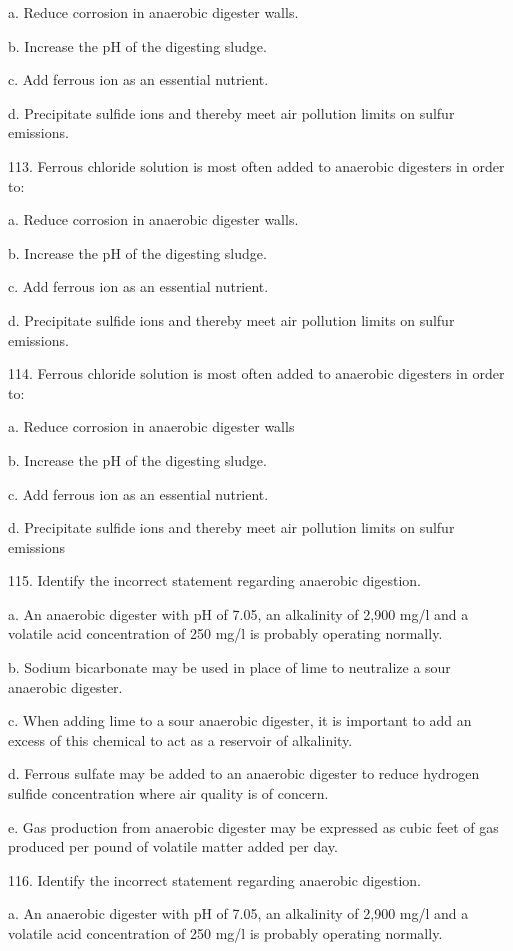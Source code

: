 \documentclass{article}
\begin{document}
a. Reduce corrosion in anaerobic digester walls. 

b. Increase the pH of the digesting sludge. 

c. Add ferrous ion as an essential nutrient. 

d. Precipitate sulfide ions and thereby meet air pollution limits on sulfur emissions. 


113. Ferrous chloride solution is most often added to anaerobic digesters in order to: 

a. Reduce corrosion in anaerobic digester walls. 

b. Increase the pH of the digesting sludge. 

c. Add ferrous ion as an essential nutrient. 

d. Precipitate sulfide ions and thereby meet air pollution limits on sulfur emissions. 


114. Ferrous chloride solution is most often added to anaerobic digesters in order to: 

a. Reduce corrosion in anaerobic digester walls 

b. Increase the pH of the digesting sludge. 

c. Add ferrous ion as an essential nutrient. 

d. Precipitate sulfide ions and thereby meet air pollution limits on sulfur emissions 


115. Identify the incorrect statement regarding anaerobic digestion. 

a. An anaerobic digester with pH of 7.05, an alkalinity of 2,900 mg/l and a volatile acid concentration of 250 mg/l is probably operating normally. 

b. Sodium bicarbonate may be used in place of lime to neutralize a sour anaerobic digester. 

c. When adding lime to a sour anaerobic digester, it is important to add an excess of this chemical to act as a reservoir of alkalinity. 

d. Ferrous sulfate may be added to an anaerobic digester to reduce hydrogen sulfide concentration where air quality is of concern. 

e. Gas production from anaerobic digester may be expressed as cubic feet of gas produced per pound of volatile matter added per day. 


116. Identify the incorrect statement regarding anaerobic digestion. 

a. An anaerobic digester with pH of 7.05, an alkalinity of 2,900 mg/l and a volatile acid concentration of 250 mg/l is probably operating normally. 
\end{document}
